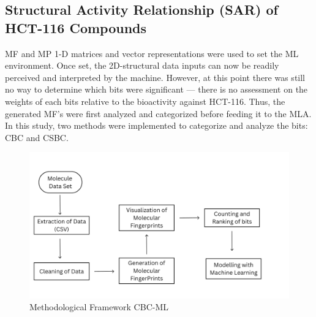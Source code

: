\subsection*{Structural Activity Relationship (SAR) of HCT-116 Compounds}
MF and MP 1-D matrices and vector representations were used to set the ML environment. Once set, the 2D-structural data inputs can now be readily perceived and interpreted by the machine. However, at this point there was still no way to determine which bits were significant --- there is no assessment on the weights of each bits relative to the bioactivity against HCT-116. Thus, the generated MF's were first analyzed and categorized before feeding it to the MLA. In this study, two methods were implemented to categorize and analyze the bits: CBC and CSBC.
  

\begin{figure}[h] %
	\centering
    \includegraphics[scale = 0.33]{cbcv2.png}
    \vspace{-1cm} %
    \caption{Methodological Framework CBC-ML}
    \label{fig:CBC} %
\end{figure}

